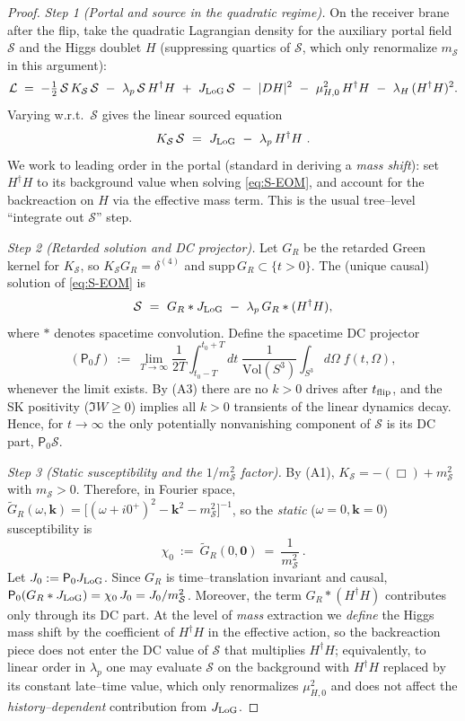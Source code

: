 \documentclass[10pt]{article}
\theoremstyle{definition}
\theoremstyle{plain}
\begin{document}
\begin{proof}
\emph{Step 1 (Portal and source in the quadratic regime).}
On the receiver brane after the flip, take the quadratic Lagrangian density for the auxiliary portal field
$\mathcal S$ and the Higgs doublet $H$ (suppressing quartics of $\mathcal S$, which only renormalize
$m_{\mathcal S}$ in this argument):
\[
\mathcal L\;=\;-\tfrac12\,\mathcal S\,K_{\mathcal S}\,\mathcal S\ -\ \lambda_p\,\mathcal S\,H^\dagger H\ +\ J_{\rm LoG}\,\mathcal S
\ -\ |D H|^2\ -\ \mu_{H,0}^2\,H^\dagger H\ -\ \lambda_H\,(H^\dagger H)^2.
\]
Varying w.r.t.\ $\mathcal S$ gives the linear sourced equation
\begin{equation}
\label{eq:S-EOM}
K_{\mathcal S}\,\mathcal S\ =\ J_{\rm LoG}\ -\ \lambda_p\,H^\dagger H\ .
\end{equation}
We work to leading order in the portal (standard in deriving a \emph{mass shift}): set $H^\dagger H$
to its background value when solving \eqref{eq:S-EOM}, and account for the backreaction on $H$ via the
effective mass term. This is the usual tree–level “integrate out $\mathcal S$” step.

\emph{Step 2 (Retarded solution and DC projector).}
Let $G_R$ be the retarded Green kernel for $K_{\mathcal S}$, so $K_{\mathcal S}G_R=\delta^{(4)}$ and
$\mathrm{supp}\,G_R\subset\{t>0\}$. The (unique causal) solution of \eqref{eq:S-EOM} is
\[
\mathcal S\ =\ G_R * J_{\rm LoG}\ -\ \lambda_p\,G_R * (H^\dagger H),
\]
where $*$ denotes spacetime convolution. Define the spacetime DC projector
\[
(\mathsf P_0 f)\ :=\ \lim_{T\to\infty}\frac{1}{2T}\int_{t_0-T}^{t_0+T}\!\!dt\;\frac{1}{\mathrm{Vol}(S^3)}\int_{S^3}\!d\Omega\;f(t,\Omega),
\]
whenever the limit exists. By (A3) there are no $k>0$ drives after $t_{\rm flip}$, and the SK positivity
($\Im W\ge 0$) implies all $k>0$ transients of the linear dynamics decay. Hence, for $t\to\infty$ the
only potentially nonvanishing component of $\mathcal S$ is its DC part, $\mathsf P_0\mathcal S$.

\emph{Step 3 (Static susceptibility and the $1/m_{\mathcal S}^2$ factor).}
By (A1), $K_{\mathcal S}=-(\Box)+m_{\mathcal S}^2$ with $m_{\mathcal S}>0$. Therefore, in Fourier space,
$\widetilde G_R(\omega,\mathbf k)=\big[(\omega+i0^+)^2-\mathbf k^2-m_{\mathcal S}^2\big]^{-1}$, so the
\emph{static} ($\omega=0,\mathbf k=0$) susceptibility is
\[
\chi_0\ :=\ \widetilde G_R(0,\mathbf 0)\ =\ \frac{1}{m_{\mathcal S}^2}\ .
\]
Let $J_0:=\mathsf P_0 J_{\rm LoG}$. Since $G_R$ is time–translation invariant and causal,
$\mathsf P_0(G_R*J_{\rm LoG})=\chi_0\,J_0=J_0/m_{\mathcal S}^2$. Moreover, the term
$G_R*(H^\dagger H)$ contributes only through its DC part. At the level of \emph{mass} extraction we
\emph{define} the Higgs mass shift by the coefficient of $H^\dagger H$ in the effective action,
so the backreaction piece does not enter the DC value of $\mathcal S$ that multiplies $H^\dagger H$;
equivalently, to linear order in $\lambda_p$ one may evaluate $\mathcal S$ on the background with
$H^\dagger H$ replaced by its constant late–time value, which only renormalizes $\mu_{H,0}^2$ and does
not affect the \emph{history–dependent} contribution from $J_{\rm LoG}$.


\end{proof}
\end{document}
